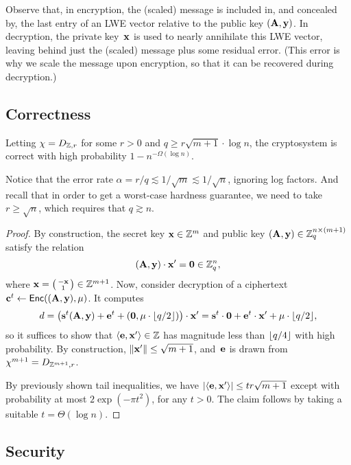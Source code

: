 \documentclass[11pt]{article}
\begin{document}
Observe that, in encryption, the (scaled) message is included in, and
concealed by, the last entry of an LWE vector relative to the public
key $(\matA, \vecy)$. In decryption, the private key~$\vecx$ is used
to nearly annihilate this LWE vector, leaving behind just the (scaled)
message plus some residual error. (This error is why we scale the
message upon encryption, so that it can be recovered during
decryption.)

\subsection{Correctness}
\label{sec:correctness}

\begin{lemma}
  \label{lem:correct}
  Letting $\chi = D_{\Z,r}$ for some $r > 0$ and
  $q \geq r \sqrt{m+1} \cdot \log n$, the cryptosystem is correct with
  high probability $1-n^{-\Omega(\log n)}$.
\end{lemma}
Notice that the error rate
$\alpha = r/q \lesssim 1/\sqrt{m} \lesssim 1/\sqrt{n}$, ignoring log
factors. And recall that in order to get a worst-case hardness
guarantee, we need to take $r \geq \sqrt{n}$, which requires that
$q \gtrsim n$.

\begin{proof}
  By construction, the secret key $\vecx \in \Z^{m}$ and public key
  $(\matA,\vecy) \in \Zq^{n \times (m+1)}$ satisfy the relation
  \[ (\matA, \vecy) \cdot \vecx' = \veczero \in \Zq^{n} ,
  \]
  where $\vecx = \smlmat{-\vecx \\ 1} \in \Z^{m+1}$. Now, consider
  decryption of a ciphertext
  $\vecc^{t} \gets \pkcenc((\matA, \vecy), \mu)$. It computes
  \[ d = \parens*{\vecs^{t} (\matA, \vecy) + \vece^{t} + (\veczero,\mu
      \cdot \floor{q/2})} \cdot \vecx' = \vecs^{t} \cdot \veczero +
    \vece^{t} \cdot \vecx' + \mu \cdot \floor{q/2} ,
  \]
  so it suffices to show that $\inner{\vece,\vecx'} \in \Z$ has
  magnitude less than $\floor{q/4}$ with high probability. By
  construction, $\length{\vecx'} \leq \sqrt{m+1}$, and~$\vece$ is
  drawn from $\chi^{m+1} = D_{\Z^{m+1},r}$.

  By previously shown tail inequalities, we have
  $\abs{\inner{\vece,\vecx'}} \leq t r \sqrt{m+1}$ except with
  probability at most $2\exp(-\pi t^{2})$, for any $t > 0$. The claim
  follows by taking a suitable $t = \Theta(\log n)$.
\end{proof}

\subsection{Security}
\label{sec:security}
\end{document}
